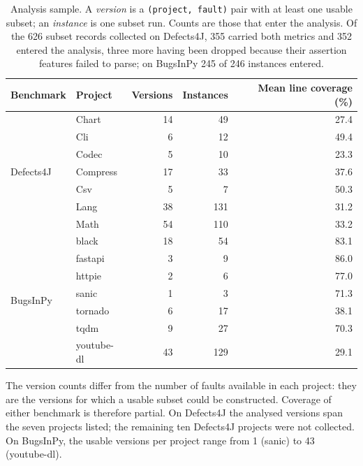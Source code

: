 \documentclass[preprint,12pt]{elsarticle}
\begin{document}
\begin{table}[t]
\centering
\begin{threeparttable}
\caption{Analysis sample. A \emph{version} is a \texttt{(project, fault)}
pair with at least one usable subset; an \emph{instance} is one subset run.
Counts are those that enter the analysis. Of the \num{626} subset records
collected on Defects4J, \num{355} carried both metrics and \num{352} entered
the analysis, three more having been dropped because their assertion features
failed to parse; on BugsInPy \num{245} of \num{246} instances entered.}
\label{tab:subjects}
\begin{tabular}{llrrr}
\toprule
Benchmark & Project & Versions & Instances & Mean line coverage (\%) \\
\midrule
\multirow{7}{*}{Defects4J}
 & Chart    & 14 &  49 & 27.4 \\
 & Cli      &  6 &  12 & 49.4 \\
 & Codec    &  5 &  10 & 23.3 \\
 & Compress & 17 &  33 & 37.6 \\
 & Csv      &  5 &   7 & 50.3 \\
 & Lang     & 38 & 131 & 31.2 \\
 & Math     & 54 & 110 & 33.2 \\
\midrule
\multirow{7}{*}{BugsInPy}
 & black      & 18 &  54 & 83.1 \\
 & fastapi    &  3 &   9 & 86.0 \\
 & httpie     &  2 &   6 & 77.0 \\
 & sanic      &  1 &   3 & 71.3 \\
 & tornado    &  6 &  17 & 38.1 \\
 & tqdm       &  9 &  27 & 70.3 \\
 & youtube-dl & 43 & 129 & 29.1 \\
\bottomrule
\end{tabular}
\begin{tablenotes}\footnotesize
\item The version counts differ from the number of faults available in each
project: they are the versions for which a usable subset could be
constructed. Coverage of either benchmark is therefore partial. On
Defects4J the analysed versions span the seven projects listed; the
remaining ten Defects4J projects were not collected. On BugsInPy, the
usable versions per project range from \num{1} (sanic) to \num{43}
(youtube-dl).
\end{tablenotes}
\end{threeparttable}
\end{table}
\end{document}
